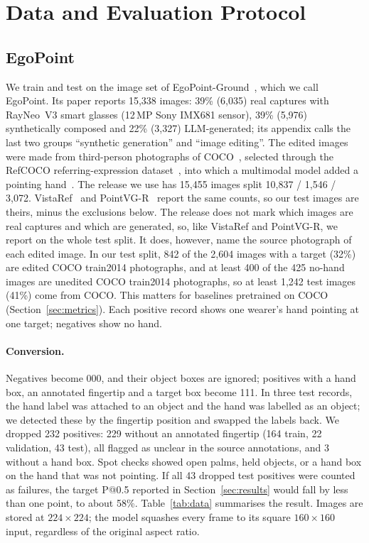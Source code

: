 \section{Data and Evaluation Protocol}\label{sec:data}

\subsection{EgoPoint}
We train and test on the image set of EgoPoint-Ground~\cite{egopoint}, which we call EgoPoint. Its paper reports 15,338 images: 39\% (6,035) real captures with RayNeo~V3 smart glasses (12\,MP Sony IMX681 sensor), 39\% (5,976) synthetically composed and 22\% (3,327) LLM-generated; its appendix calls the last two groups ``synthetic generation'' and ``image editing''. The edited images were made from third-person photographs of COCO~\cite{lin2014coco}, selected through the RefCOCO referring-expression dataset~\cite{yu2016modeling}, into which a multimodal model added a pointing hand~\cite{egopoint}. The release we use has 15,455 images split 10,837 / 1,546 / 3,072. VistaRef~\cite{li2026vistaref} and PointVG-R~\cite{li2026pointvgr} report the same counts, so our test images are theirs, minus the exclusions below. The release does not mark which images are real captures and which are generated, so, like VistaRef and PointVG-R, we report on the whole test split. It does, however, name the source photograph of each edited image. In our test split, 842 of the 2,604 images with a target (32\%) are edited COCO train2014 photographs, and at least 400 of the 425 no-hand images are unedited COCO train2014 photographs, so at least 1,242 test images (41\%) come from COCO. This matters for baselines pretrained on COCO (Section~\ref{sec:metrics}). Each positive record shows one wearer's hand pointing at one target; negatives show no hand.

\paragraph{Conversion.} Negatives become 000, and their object boxes are ignored; positives with a hand box, an annotated fingertip and a target box become 111. In three test records, the hand label was attached to an object and the hand was labelled as an object; we detected these by the fingertip position and swapped the labels back. We dropped 232 positives: 229 without an annotated fingertip (164 train, 22 validation, 43 test), all flagged as unclear in the source annotations, and 3 without a hand box. Spot checks showed open palms, held objects, or a hand box on the hand that was not pointing. If all 43 dropped test positives were counted as failures, the target P@0.5 reported in Section~\ref{sec:results} would fall by less than one point, to about 58\%. Table~\ref{tab:data} summarises the result. Images are stored at $224\times224$; the model squashes every frame to its square $160\times160$ input, regardless of the original aspect ratio.

